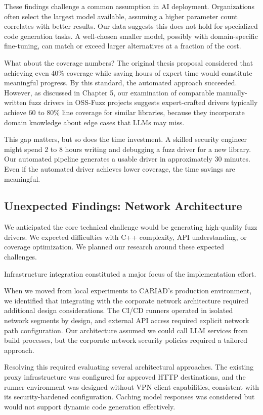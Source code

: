 These findings challenge a common assumption in AI deployment. Organizations often select the largest model available, assuming a higher parameter count correlates with better results. Our data suggests this does not hold for specialized code generation tasks. A well-chosen smaller model, possibly with domain-specific fine-tuning, can match or exceed larger alternatives at a fraction of the cost.

What about the coverage numbers? The original thesis proposal considered that achieving even 40\% coverage while saving hours of expert time would constitute meaningful progress. By this standard, the automated approach succeeded. However, as discussed in Chapter 5, our examination of comparable manually-written fuzz drivers in OSS-Fuzz projects suggests expert-crafted drivers typically achieve 60 to 80\% line coverage for similar libraries, because they incorporate domain knowledge about edge cases that LLMs may miss.

This gap matters, but so does the time investment. A skilled security engineer might spend 2 to 8 hours writing and debugging a fuzz driver for a new library. Our automated pipeline generates a usable driver in approximately 30 minutes. Even if the automated driver achieves lower coverage, the time savings are meaningful.


\subsection{Unexpected Findings: Network Architecture}
\label{sec:discussion_network}

We anticipated the core technical challenge would be generating high-quality fuzz drivers. We expected difficulties with C++ complexity, API understanding, or coverage optimization. We planned our research around these expected challenges.

Infrastructure integration constituted a major focus of the implementation effort.

When we moved from local experiments to CARIAD's production environment, we identified that integrating with the corporate network architecture required additional design considerations. The CI/CD runners operated in isolated network segments by design, and external API access required explicit network path configuration. Our architecture assumed we could call LLM services from build processes, but the corporate network security policies required a tailored approach.

Resolving this required evaluating several architectural approaches. The existing proxy infrastructure was configured for approved HTTP destinations, and the runner environment was designed without VPN client capabilities, consistent with its security-hardened configuration. Caching model responses was considered but would not support dynamic code generation effectively.


